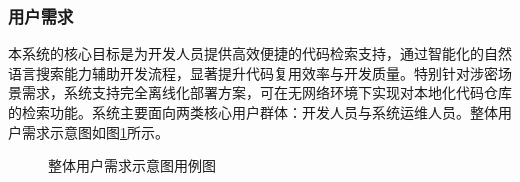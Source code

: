 \documentclass[UTF8,a4paper,12pt]{ctexart}
\numberwithin{equation}{section}
\begin{document}
\subsubsection{用户需求}
本系统的核心目标是为开发人员提供高效便捷的代码检索支持，通过智能化的自然语言搜索能力辅助开发流程，显著提升代码复用效率与开发质量。特别针对涉密场景需求，系统支持完全离线化部署方案，可在无网络环境下实现对本地化代码仓库的检索功能。系统主要面向两类核心用户群体：开发人员与系统运维人员。整体用户需求示意图如图\ref{flow}所示。
\begin{figure}[H]
	\caption{整体用户需求示意图用例图}
	\label{flow}
\end{figure}
\end{document}
